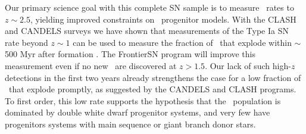 \documentclass[12pt]{article}
\begin{document}
Our primary science goal with this complete SN sample is to measure
\SNIa\ rates to $z\sim2.5$, yielding improved constraints on
\SNIa\ progenitor models.  With the CLASH and CANDELS surveys we have
shown that measurements of the Type Ia SN rate beyond $z\sim1$ can be
used to measure the fraction of \SNIa\ that explode within $\sim$500
Myr after formation \citep{Graur:2014,Rodney:2014}.  The FrontierSN
program will improve this measurement even if no new \SNe\ are
discovered at $z>1.5$.  Our lack of such high-$z$ detections in the
first two years already strengthens the case for a low fraction of
\SNIa\ that explode promptly, as suggested by the CANDELS and CLASH
programs.  To first order, this low rate supports the hypothesis that
the \SNIa\ population is dominated by double white dwarf progenitor
systems, and very few have progenitors systems with main sequence or
giant branch donor stars.
\end{document}
